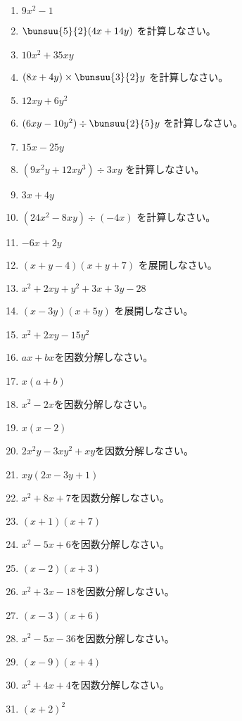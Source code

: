 \documentclass[uplatex,a4j,11pt]{jsreport}
\begin{document}
\begin{multicols}{2}
\begin{enumerate}
    \item $9x^2-1$
    \item $\bunsuu{5}{2}(4x+14y)$ を計算しなさい。%
    \item $10x^2+35xy$
    \item $(8x+4y)\times \bunsuu{3}{2}y$ を計算しなさい。%
    \item $12xy+6y^2$
    \item $(6xy-10y^2)\div \bunsuu{2}{5}y$ を計算しなさい。%
    \item $15x-25y$
    \item $(9x^2y+12xy^3)\div 3xy$ を計算しなさい。%
    \item $3x+4y$
    \item $(24x^2-8xy)\div (-4x)$ を計算しなさい。%
    \item $-6x+2y$
    \item $(x+y-4)(x+y+7)$ を展開しなさい。%
    \item $x^2+2xy+y^2+3x+3y-28$
    \item $(x-3y)(x+5y)$ を展開しなさい。%
    \item $x^2+2xy-15y^2$
    \item $ax+bx$を因数分解しなさい。%
    \item $x(a+b)$
    \item $x^2-2x$を因数分解しなさい。%
    \item $x(x-2)$
    \item $2x^2y-3xy^2+xy$を因数分解しなさい。%
    \item $xy(2x-3y+1)$
    \item $x^2+8x+7$を因数分解しなさい。%
    \item $(x+1)(x+7)$
    \item $x^2-5x+6$を因数分解しなさい。%
    \item $(x-2)(x+3)$
    \item $x^2+3x-18$を因数分解しなさい。%
    \item $(x-3)(x+6)$
    \item $x^2-5x-36$を因数分解しなさい。%
    \item $(x-9)(x+4)$
    \item $x^2+4x+4$を因数分解しなさい。%
    \item $(x+2)^2$

\end{enumerate}
\end{multicols}
\end{document}
